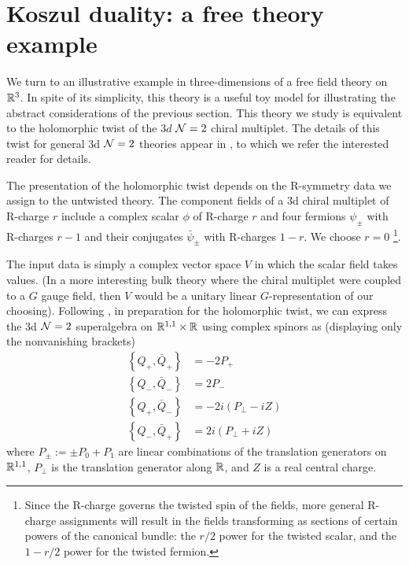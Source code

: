 \documentclass[11pt]{amsart}
\def\brian#1{{\textcolor{blue!65!red}{BRW: {#1}}}}
\begin{document}


\section{Koszul duality: a free theory example}\label{s:free}


We turn to an illustrative example in three-dimensions of a free field theory on $\mathbb R^3$. In spite of its simplicity, this theory is a useful toy model for illustrating the abstract considerations of the previous section. 
This theory we study is equivalent to the holomorphic twist of the $3d$ $\mathcal N=2$ chiral multiplet. The details of this twist for general 3d $\mathcal N=2$ theories appear in \cite{CDG, ACNV, ESW}, to which we refer the interested reader for details. 

The presentation of the holomorphic twist depends on the R-symmetry data we assign to the untwisted theory. 
The component fields of a 3d chiral multiplet of R-charge $r$ include a complex scalar $\phi$ of R-charge $r$ and four fermions $\psi_{\pm}$ with R-charges  $r-1$ and their conjugates $\bar{\psi}_{\pm}$ with R-charges $1-r$. We choose $r=0$ \footnote{Since the R-charge governs the twisted spin of the fields, more general R-charge assignments will result in the fields transforming as sections of certain powers of the canonical bundle: the $r/2$ power for the twisted scalar, and the $1-r/2$ power for the twisted fermion.}.  

The input data is simply a complex vector space $V$ in which the scalar field takes values. (In a more interesting bulk theory where the chiral multiplet were coupled to a $G$ gauge field, then $V$ would be a unitary linear $G$-representation of our choosing). Following \cite{DGP}, in preparation for the holomorphic twist, we can express the 3d $\mathcal N=2$ superalgebra on $\mathbb R^{1,1} \times \mathbb R$ using complex spinors as (displaying only the nonvanishing brackets)
\begin{align*}
\left\lbrace Q_+, \bar{Q}_+ \right\rbrace &= -2 P_+ \\
\left\lbrace Q_-, \bar{Q}_- \right\rbrace &= 2 P_- \\
\left\lbrace Q_+, \bar{Q}_- \right\rbrace &= -2 i (P_{\perp} - i Z) \\
\left\lbrace Q_-, \bar{Q}_+ \right\rbrace &= 2 i (P_{\perp} + i Z)
\end{align*} where $P_{\pm} := \pm P_0 + P_1$ are linear combinations of the translation generators on $\mathbb R^{1, 1}$, $P_{\perp}$ is the translation generator along $\mathbb R$, and $Z$ is a real central charge.
\end{document}
